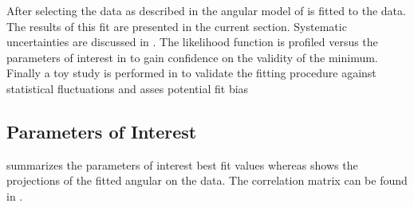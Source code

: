 After selecting the data as described in  the angular model of  is fitted to the data.
The results of this fit are presented in the current section. Systematic uncertainties are discussed in .
The likelihood function is profiled versus the parameters of interest in  to gain confidence on the validity
of the minimum. Finally a toy study is performed in  to validate the fitting procedure against
statistical fluctuations and asses potential fit bias

\subsection{Parameters of Interest}
\label{Parameters_of_Interest}

 summarizes the parameters of interest best fit values whereas
 shows the projections of the fitted angular \pdf   on the data.
The correlation matrix can be found in .

